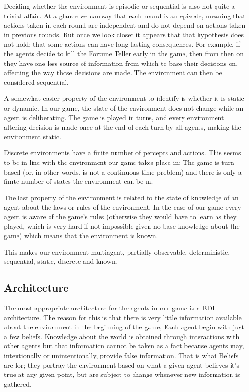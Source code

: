 \documentclass{article}
\begin{document}
Deciding whether the environment is episodic or sequential is also not quite a trivial affair. At a glance we can say that each round is an episode, meaning that actions taken in each round are independent and do not depend on actions taken in previous rounds. But once we look closer it appears that that hypothesis does not hold; that some actions can have long-lasting consequences. For example, if the agents decide to kill the Fortune Teller early in the game, then from then on they have one less source of information from which to base their decisions on, affecting the way those decisions are made. The environment can then be considered sequential.

A somewhat easier property of the environment to identify is whether it is static or dynamic. In our game, the state of the environment does not change while an agent is deliberating. The game is played in turns, and every environment altering decision is made once at the end of each turn by all agents, making the environment static.

Discrete environments have a finite number of percepts and actions. This seems to be in line with the environment our game takes place in: The game is turn-based (or, in other words, is not a continuous-time problem) and there is only a finite number of states the environment can be in. 

The last property of the environment is related to the state of knowledge of an agent about the laws or rules of the environment. In the case of our game every agent is aware of the game's rules (otherwise they would have to learn as they played, which is very hard if not impossible given no base knowledge about the game) which means that the environment is known.

This makes our environment multiagent, partially observable, deterministic, sequential, static, discrete and known.

\subsection{Architecture}

The most appropriate architecture for the agents in our game is a BDI architecture. The reason for this is that there is very little information available about the environment in the beginning of the game; Each agent begin with just a few beliefs. Knowledge about the world is obtained through interactions with other agents but that information cannot be taken as a fact because agents may, intentionally or unintentionally, provide false information. That is what Beliefs are for; they portray the environment based on what a given agent believes it's true at any given point, but are subject to change whenever new information is gathered.
\end{document}
